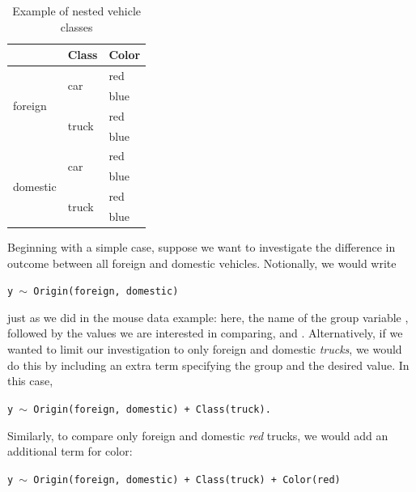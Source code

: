 \begin{table}[H]
\centering
\def\arraystretch{1.5}
\begin{tabular}{|p{0.9in}|p{0.9in}|p{0.9in}|} \hline 
\rowcolor{lightgray} \multicolumn{1}{|c|}{Origin} & \multicolumn{1}{c|}{Class} & \multicolumn{1}{c|}{Color}\\
\hline
\multirow{4}{*}{foreign} & \multirow{2}{*}{car} & red \\
\hhline{~~-}
& & blue \\
\hhline{~--}
& \multirow{2}{*}{truck} & red \\
\hhline{~~-}
& & blue \\
\hline
\multirow{4}{*}{domestic} & \multirow{2}{*}{car} & red \\
\hhline{~~-}
& & blue \\
\hhline{~--}
& \multirow{2}{*}{truck} & red \\
\hhline{~~-}
& & blue \\
\hline
\end{tabular}
\caption{Example of nested vehicle classes}
\label{tab:vehicle}
\end{table}


Beginning with a simple case, suppose we want to investigate the difference in outcome between all foreign and domestic vehicles. Notionally, we would write

\begin{center}
\tt y $\sim$ Origin(foreign, domestic)
\end{center}

just as we did in the mouse data example: here, the name of the group variable , followed by the values we are interested in comparing,  and . Alternatively, if we wanted to limit our investigation to only foreign and domestic \textit{trucks}, we would do this by including an extra term specifying the group and the desired value. In this case, 

\begin{center}
\tt y $\sim$ Origin(foreign, domestic) + Class(truck).
\end{center}

Similarly, to compare only foreign and domestic \textit{red} trucks, we would add an additional term for color:

\begin{center}
\tt y $\sim$ Origin(foreign, domestic) + Class(truck) + Color(red)
\end{center}

